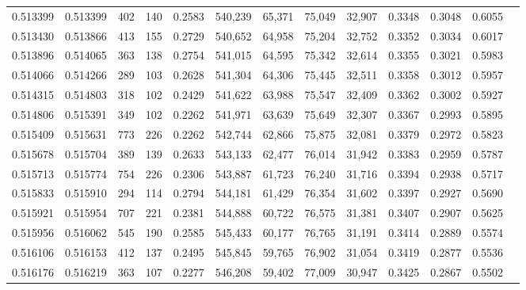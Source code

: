 \begin{tabular}{rrrrrrrrrrrrr}
0.513399 & 0.513399 &   402 &   140 &                                     0.2583 & 540,239 &  65,371 &  75,049 &  32,907 & 0.3348 & 0.3048 & 0.6055 \\
0.513430 & 0.513866 &   413 &   155 &                                     0.2729 & 540,652 &  64,958 &  75,204 &  32,752 & 0.3352 & 0.3034 & 0.6017 \\
0.513896 & 0.514065 &   363 &   138 &                                     0.2754 & 541,015 &  64,595 &  75,342 &  32,614 & 0.3355 & 0.3021 & 0.5983 \\
0.514066 & 0.514266 &   289 &   103 &                                     0.2628 & 541,304 &  64,306 &  75,445 &  32,511 & 0.3358 & 0.3012 & 0.5957 \\
0.514315 & 0.514803 &   318 &   102 &                                     0.2429 & 541,622 &  63,988 &  75,547 &  32,409 & 0.3362 & 0.3002 & 0.5927 \\
0.514806 & 0.515391 &   349 &   102 &                                     0.2262 & 541,971 &  63,639 &  75,649 &  32,307 & 0.3367 & 0.2993 & 0.5895 \\
0.515409 & 0.515631 &   773 &   226 &                                     0.2262 & 542,744 &  62,866 &  75,875 &  32,081 & 0.3379 & 0.2972 & 0.5823 \\
0.515678 & 0.515704 &   389 &   139 &                                     0.2633 & 543,133 &  62,477 &  76,014 &  31,942 & 0.3383 & 0.2959 & 0.5787 \\
0.515713 & 0.515774 &   754 &   226 &                                     0.2306 & 543,887 &  61,723 &  76,240 &  31,716 & 0.3394 & 0.2938 & 0.5717 \\
0.515833 & 0.515910 &   294 &   114 &                                     0.2794 & 544,181 &  61,429 &  76,354 &  31,602 & 0.3397 & 0.2927 & 0.5690 \\
0.515921 & 0.515954 &   707 &   221 &                                     0.2381 & 544,888 &  60,722 &  76,575 &  31,381 & 0.3407 & 0.2907 & 0.5625 \\
0.515956 & 0.516062 &   545 &   190 &                                     0.2585 & 545,433 &  60,177 &  76,765 &  31,191 & 0.3414 & 0.2889 & 0.5574 \\
0.516106 & 0.516153 &   412 &   137 &                                     0.2495 & 545,845 &  59,765 &  76,902 &  31,054 & 0.3419 & 0.2877 & 0.5536 \\
0.516176 & 0.516219 &   363 &   107 &                                     0.2277 & 546,208 &  59,402 &  77,009 &  30,947 & 0.3425 & 0.2867 & 0.5502 \\

\end{tabular}
